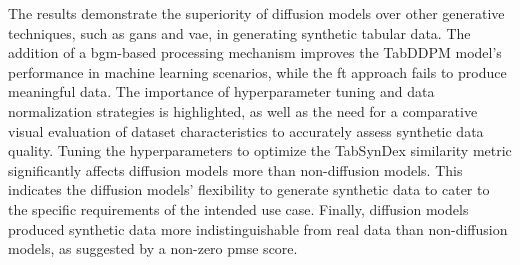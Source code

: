 The results demonstrate the superiority of diffusion \glspl{model} over other generative techniques, such as \Glspl{gan} and \gls{vae}, in generating synthetic tabular data.
The addition of a \gls{bgm}-based processing mechanism improves the TabDDPM \gls{model}'s performance in machine learning scenarios, while the \gls{ft} approach fails to produce meaningful data. 
The importance of hyperparameter tuning and data normalization strategies is highlighted, as well as the need for a comparative visual evaluation of dataset characteristics to accurately assess synthetic data quality. 
Tuning the hyperparameters to optimize the TabSynDex similarity metric significantly affects diffusion \glspl{model} more than non-diffusion \glspl{model}. 
This indicates the diffusion \glspl{model}' flexibility to generate synthetic data to cater to the specific requirements of the intended use case.
Finally, diffusion \glspl{model} produced synthetic data more indistinguishable from real data than non-diffusion \glspl{model}, as suggested by a non-zero \gls{pmse} score.

\cleardoublepage 
